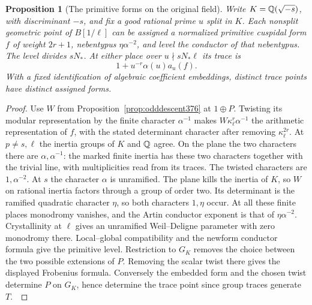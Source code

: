 \documentclass[a4paper,11pt]{article}
\newtheorem{proposition}{Proposition}[section]
\theoremstyle{definition}
\theoremstyle{remark}
\numberwithin{equation}{section}
\begin{document}
\begin{proposition}[The primitive forms on the original field]
\label{prop:planelabels379}
Write \(K=\mathbb Q(\sqrt{-s})\), with discriminant \(-s\), and fix
a good rational prime \(u\) split in \(K\). Each nonsplit
geometric point of \(B[1/\ell]\) can be assigned a normalized
primitive cuspidal form \(f\) of weight \(2r+1\), nebentypus
\(\eta\alpha^{-2}\), and level the conductor of that
nebentypus. The level divides \(sN_*\). At either place over
\(u\nmid sN_*\ell\) its trace is
\[
                       1+u^{-r}\alpha(u)a_u(f).
\]
With a fixed identification of algebraic coefficient embeddings,
distinct trace points have distinct assigned forms.
\end{proposition}
\begin{proof}
Use \(W\) from Proposition~\ref{prop:odddescent376} at
\(1\oplus P\). Twisting its modular representation by the
finite character \(\alpha^{-1}\) makes
\(W\kappa_\ell^r\alpha^{-1}\) the arithmetic representation
of \(f\), with the stated determinant character after
removing \(\kappa_\ell^{2r}\). At \(p\ne s,\ell\) the
inertia groups of \(K\) and \(\mathbb Q\) agree. On the plane
the two characters there are \(\alpha,\alpha^{-1}\):
the marked finite inertia has these two characters together
with the trivial line, with multiplicities read from its
traces. The twisted characters are \(1,\alpha^{-2}\).
At \(s\) the character \(\alpha\) is unramified. The plane
kills the inertia of \(K\), so \(W\) on rational inertia
factors through a group of order two. Its determinant
is the ramified quadratic character \(\eta\), so both
characters \(1,\eta\) occur. At all these finite places
monodromy vanishes, and the Artin conductor exponent is
that of \(\eta\alpha^{-2}\). Crystallinity at \(\ell\)
gives an unramified Weil--Deligne parameter with zero
monodromy there. Local--global compatibility and the
newform conductor formula give the primitive level.
Restriction to \(G_K\) removes the choice between the
two possible extensions of \(P\). Removing the scalar twist
there gives the displayed Frobenius formula. Conversely
the embedded form and the chosen twist determine \(P\)
on \(G_K\), hence determine the trace point since group
traces generate \(T\).~\cite{VIII-VI-VI-carayol117,VIII-VI-VI-saito40}
\end{proof}
\end{document}
